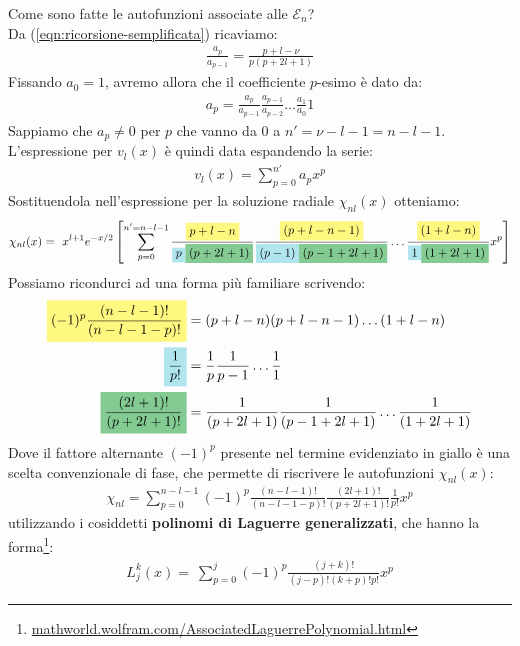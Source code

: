 \documentclass[../../FisicaTeorica.tex]{subfiles}
\begin{document}
Come sono fatte le autofunzioni associate alle $\mathcal{E}_n$?\\
Da (\ref{eqn:ricorsione-semplificata}) ricaviamo:
\begin{align*}
\frac{a_{p}}{a_{p-1}}=\frac{p+l-\nu}{p(p+2l+1)}
\end{align*}
Fissando $a_0 = 1$, avremo allora che il coefficiente $p$-esimo è dato da:
\begin{align*}
a_p = \frac{a_{p}}{a_{p-1}} \frac{a_{p-1}}{a_{p-2}}\dots \frac{a_1}{a_0}1
\end{align*}
Sappiamo che $a_p \neq 0$ per $p$ che vanno da $0$ a $n' = \nu -l-1 = n - l -1$. L'espressione per $v_l(x)$ è quindi data espandendo la serie:
\begin{align*}
v_l(x) = \sum_{p=0}^{n'} a_p x^p
\end{align*}
Sostituendola nell'espressione per la soluzione radiale $\chi_{nl}(x)$ otteniamo:
\begin{align*}
\chi_{nl}(x) =\ x^{l+1} e^{-x/2} \left[
\sum_{p=0}^{n' = n - l -1} \frac{\hlc{Yellow}{p+l-n}}{\hlc{SkyBlue}{p}\hlc{ForestGreen}{(p+2l+1)}}
\frac{\hlc{Yellow}{(p+l-n-1)}}{\hlc{SkyBlue}{(p-1)}\hlc{ForestGreen}{(p-1+2l+1)}}\dots\frac{\hlc{Yellow}{(1+l-n)}}{\hlc{SkyBlue}{1}\hlc{ForestGreen}{(1+2l+1)}} x^p
\right]
\end{align*}
Possiamo ricondurci ad una forma più familiare scrivendo:
\begin{align*}
\hlc{Yellow}{(-1)^p \frac{(n-l-1)!}{(n-l-1-p)!}} &=
(p+l-n)(p+l-n-1)\dots(1+l-n)\\
\hlc{SkyBlue}{\frac{1}{p!}} &= \frac{1}{p}\frac{1}{p-1}\dots \frac{1}{1}\\
\hlc{ForestGreen}{\frac{(2l+1)!}{(p+2l+1)!}} &=\frac{1}{(p+2l+1)}\frac{1}{(p-1+2l+1)}\dots\frac{1}{(1+2l+1)}
\end{align*}
Dove il fattore alternante $(-1)^p$ presente nel termine evidenziato in giallo è una scelta convenzionale di fase, che permette di riscrivere le autofunzioni $\chi_{nl}(x)$:
\begin{align}
\chi_{nl} = \sum_{p=0}^{n-l-1} (-1)^p \frac{(n-l-1)!}{(n-l-1-p)!}\frac{(2l+1)!}{(p+2l+1)!}\frac{1}{p!} x^p
\label{eqn:chi_sum}
\end{align}
utilizzando i cosiddetti \textbf{polinomi di Laguerre generalizzati}, che hanno la forma\footnote{\url{mathworld.wolfram.com/AssociatedLaguerrePolynomial.html}}:
\begin{align}
L_j^k (x) =\ \sum_{p=0}^j (-1)^p \frac{(j+k)!}{(j-p)!(k+p)!p!}x^p
\label{eqn:laguerre}
\end{align}
\end{document}
